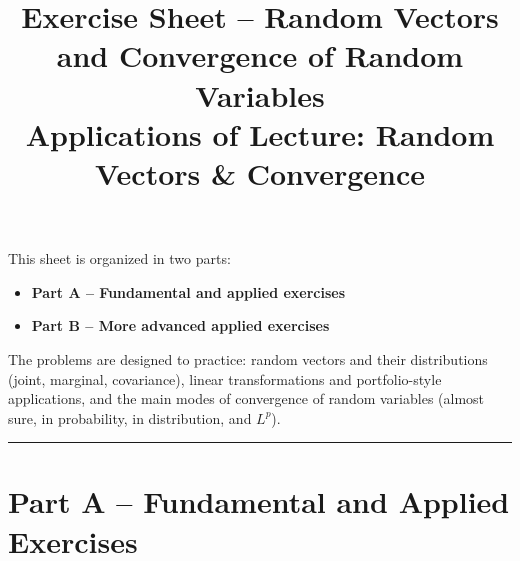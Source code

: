 \documentclass[11pt]{article}
\title{Exercise Sheet -- Random Vectors and Convergence of Random Variables\\[0.4em]
{\large Applications of Lecture: Random Vectors \& Convergence}}
\author{}
\date{}
\begin{document}
\maketitle

This sheet is organized in two parts:
\begin{itemize}
  \item \textbf{Part A -- Fundamental and applied exercises}
  \item \textbf{Part B -- More advanced applied exercises}
\end{itemize}

The problems are designed to practice:
random vectors and their distributions (joint, marginal, covariance),
linear transformations and portfolio-style applications,
and the main modes of convergence of random variables
(almost sure, in probability, in distribution, and \(L^p\)).

\bigskip
\hrule
\bigskip

\section*{Part A -- Fundamental and Applied Exercises}
\end{document}
